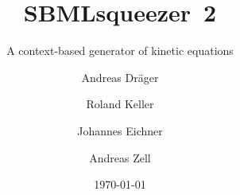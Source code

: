 \documentclass[
  BCOR12mm,
  letterpaper,
  11pt,
  headsepline,
  pointlessnumbers,
  tablecaptionabove,
  onelinecaption,
  headinclude,
  appendixprefix,
  idxtotoc,
  bibtotoc,
  twoside,
  titlepage
]{scrreprt}
\title{SBMLsqueezer~2}
\subtitle{A context-based generator of kinetic equations}
\author{Andreas Dr\"ager%
\and
Roland Keller\and
Johannes Eichner\and
Andreas Zell}
\date{\today}
\begin{document}
% 
% 
%
\maketitle
\begin{abstract}

\end{abstract}
%
\setcounter{tocdepth}{1}
\tableofcontents		%

\cleardoublepage		%


% 
% 
% 
% 
% 


% 
\appendix




\printindex
\end{document}
